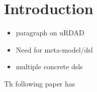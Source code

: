 \section{Introduction}

\begin{itemize}
  \item paragraph on uRDAD
  \item Need for meta-model/dsl
  \item multiple concrete dsls
\end{itemize}

Th following paper \cite{solms_urdad_2010} has
